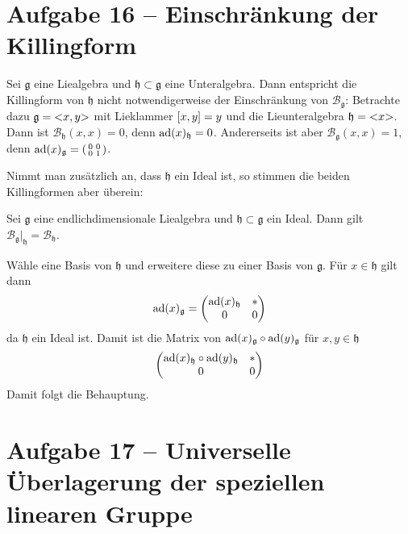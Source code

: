 \section{Aufgabe 16 -- Einschränkung der Killingform} %
\label{sec:einschr_killing}
Sei $\mathfrak{g}$ eine Liealgebra und $\mathfrak{h} \subset \mathfrak{g}$ eine Unteralgebra.
Dann entspricht die Killingform von $\mathfrak{h}$ nicht notwendigerweise der Einschränkung von $\mathcal{B}_{\mathfrak{g}}$: Betrachte dazu $\mathfrak{g} = \lenbrace{x,y}$ mit Lieklammer $\benbrace*{x,y} = y$ und die Lieunteralgebra $\mathfrak{h} = \lenbrace{x}$.  
Dann ist $\mathcal{B}_{\mathfrak{h}}(x,x) = 0$, denn $\ad(x)_{\mathfrak{h}} =0$.
Andererseits ist aber $\mathcal{B}_{\mathfrak{g}}(x,x) = 1$, denn $\ad(x)_\mathfrak{g} = \begin{psmallmatrix} 0 & 0 \\ 0 & 1 \end{psmallmatrix}$.

Nimmt man zusätzlich an, dass $\mathfrak{h}$ ein Ideal ist, so stimmen die beiden Killingformen aber überein:
\begin{lemma}
	Sei $\mathfrak{g}$ eine endlichdimensionale Liealgebra und $\mathfrak{h} \subset \mathfrak{g}$ ein Ideal.
	Dann gilt $\mathcal{B}_\mathfrak{g}\big|_{\mathfrak{h}} = \mathcal{B}_\mathfrak{h}$.
\end{lemma}
\begin{beweis}
	Wähle eine Basis von $\mathfrak{h}$ und erweitere diese zu einer Basis von $\mathfrak{g}$.
	Für $x \in \mathfrak{h}$ gilt dann
	\[
		\ad(x)_\mathfrak{g} = \begin{pmatrix}
			\ad(x)_\mathfrak{h} & * \\ 0 & 0
		\end{pmatrix}
	\]
	da $\mathfrak{h}$ ein Ideal ist.
	Damit ist die Matrix von $\ad(x)_\mathfrak{g} \circ \ad(y)_\mathfrak{g}$ für $x,y \in \mathfrak{h}$
	\[
		\begin{pmatrix}
			\ad(x)_\mathfrak{h} \circ \ad(y)_\mathfrak{h} & * \\ 0 & 0
		\end{pmatrix}
	\]
	Damit folgt die Behauptung.
\end{beweis}

\section{Aufgabe 17 -- Universelle Überlagerung der speziellen linearen Gruppe} %
\label{sec:aufg17}












